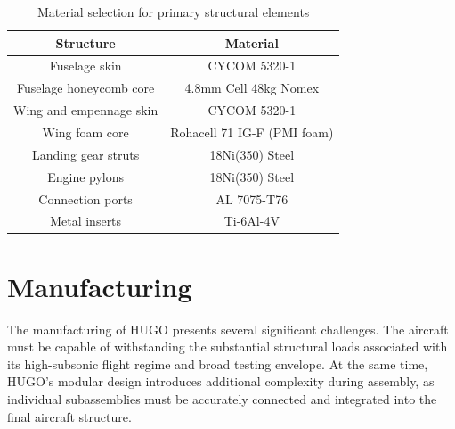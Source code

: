 \begin{table}[H]
    \centering
        \caption{Material selection for primary structural elements}
    \begin{tabular}{|c|c|}
    \hline
        \textbf{Structure} & \textbf{Material}  \\\hline\hline
         Fuselage skin & CYCOM 5320-1 \\\hline
         Fuselage honeycomb core & 4.8mm Cell 48kg Nomex \\\hline
         Wing and empennage skin & CYCOM 5320-1 \\\hline
         Wing foam core & Rohacell 71 IG-F (PMI foam) \\\hline
         Landing gear struts & 18Ni(350) Steel \\\hline
         Engine pylons & 18Ni(350) Steel \\\hline
         Connection ports & AL 7075-T76 \\\hline
         Metal inserts & Ti-6Al-4V \\\hline
         
    \end{tabular}
    \label{tab:final_material_selection}
\end{table}



\section{Manufacturing}
\label{sec:manufacturing}
The manufacturing of HUGO presents several significant challenges. The aircraft must be capable of withstanding the substantial structural loads associated with its high-subsonic flight regime and broad testing envelope. At the same time, HUGO’s modular design introduces additional complexity during assembly, as individual subassemblies must be accurately connected and integrated into the final aircraft structure. 

